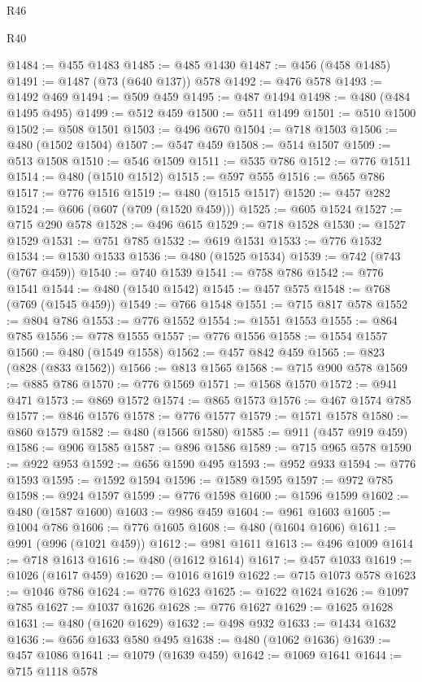 \begin{lexlean}{R46}
\begin{lexlean}{R40}
\begin{coremodule}
{{{{{{{{{{{{{{{{{{{{{{{{{{{{{{{{{{{{{{{{{{{{{{{{{{{{{{{{{{{{{{{{{{{{{{{{{{{{{{{{{{{{{{{{{{{{{{{{{{{{{{{{{{{{{@1484 := @455 @1483
@1485 := @485 @1430
@1487 := @456 (@458 @1485)
@1491 := @1487 (@73 (@640 @137)) @578
@1492 := @476 @578
@1493 := @1492 @469
@1494 := @509 @459
@1495 := @487 @1494
@1498 := @480 (@484 @1495 @495)
@1499 := @512 @459
@1500 := @511 @1499
@1501 := @510 @1500
@1502 := @508 @1501
@1503 := @496 @670
@1504 := @718 @1503
@1506 := @480 (@1502 @1504)
@1507 := @547 @459
@1508 := @514 @1507
@1509 := @513 @1508
@1510 := @546 @1509
@1511 := @535 @786
@1512 := @776 @1511
@1514 := @480 (@1510 @1512)
@1515 := @597 @555
@1516 := @565 @786
@1517 := @776 @1516
@1519 := @480 (@1515 @1517)
@1520 := @457 @282
@1524 := @606 (@607 (@709 (@1520 @459)))
@1525 := @605 @1524
@1527 := @715 @290 @578
@1528 := @496 @615
@1529 := @718 @1528
@1530 := @1527 @1529
@1531 := @751 @785
@1532 := @619 @1531
@1533 := @776 @1532
@1534 := @1530 @1533
@1536 := @480 (@1525 @1534)
@1539 := @742 (@743 (@767 @459))
@1540 := @740 @1539
@1541 := @758 @786
@1542 := @776 @1541
@1544 := @480 (@1540 @1542)
@1545 := @457 @575
@1548 := @768 (@769 (@1545 @459))
@1549 := @766 @1548
@1551 := @715 @817 @578
@1552 := @804 @786
@1553 := @776 @1552
@1554 := @1551 @1553
@1555 := @864 @785
@1556 := @778 @1555
@1557 := @776 @1556
@1558 := @1554 @1557
@1560 := @480 (@1549 @1558)
@1562 := @457 @842 @459
@1565 := @823 (@828 (@833 @1562))
@1566 := @813 @1565
@1568 := @715 @900 @578
@1569 := @885 @786
@1570 := @776 @1569
@1571 := @1568 @1570
@1572 := @941 @471
@1573 := @869 @1572
@1574 := @865 @1573
@1576 := @467 @1574 @785
@1577 := @846 @1576
@1578 := @776 @1577
@1579 := @1571 @1578
@1580 := @860 @1579
@1582 := @480 (@1566 @1580)
@1585 := @911 (@457 @919 @459)
@1586 := @906 @1585
@1587 := @896 @1586
@1589 := @715 @965 @578
@1590 := @922 @953
@1592 := @656 @1590 @495
@1593 := @952 @933
@1594 := @776 @1593
@1595 := @1592 @1594
@1596 := @1589 @1595
@1597 := @972 @785
@1598 := @924 @1597
@1599 := @776 @1598
@1600 := @1596 @1599
@1602 := @480 (@1587 @1600)
@1603 := @986 @459
@1604 := @961 @1603
@1605 := @1004 @786
@1606 := @776 @1605
@1608 := @480 (@1604 @1606)
@1611 := @991 (@996 (@1021 @459))
@1612 := @981 @1611
@1613 := @496 @1009
@1614 := @718 @1613
@1616 := @480 (@1612 @1614)
@1617 := @457 @1033
@1619 := @1026 (@1617 @459)
@1620 := @1016 @1619
@1622 := @715 @1073 @578
@1623 := @1046 @786
@1624 := @776 @1623
@1625 := @1622 @1624
@1626 := @1097 @785
@1627 := @1037 @1626
@1628 := @776 @1627
@1629 := @1625 @1628
@1631 := @480 (@1620 @1629)
@1632 := @498 @932
@1633 := @1434 @1632
@1636 := @656 @1633 @580 @495
@1638 := @480 (@1062 @1636)
@1639 := @457 @1086
@1641 := @1079 (@1639 @459)
@1642 := @1069 @1641
@1644 := @715 @1118 @578
}}}}}}}}}}}}}}}}}}}}}}}}}}}}}}}}}}}}}}}}}}}}}}}}}}}}}}}}}}}}}}}}}}}}}}}}}}}}}}}}}}}}}}}}}}}}}}}}}}}}}}}}}}}}}
\end{coremodule}
\end{lexlean}
\end{lexlean}
